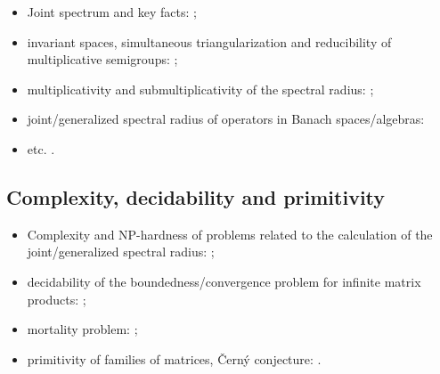\documentclass[a4paper,fleqn]{article}
\let\cite=\citep
\begin{document}
\begin{itemize}
  \item Joint spectrum and key facts: \cite{Bell:LAA05, BerWang:LAA92,
      BreSert:LMS21, EE:PAMS04, GurRod:SIAMJMAA97, Lur:LAA06:2, RS:PAMS95,
      Sert:Thesis16, Sert:CRMASP17};
  \item invariant spaces, simultaneous triangularization and reducibility of
    multiplicative semigroups: \cite{Drnov:97, Drnovsek:SM97, Drn:IEOT01,
      GPRSTT:P10, Guinand:PAMS82, HNRRR:HJM91, LMMR:JOT98, OmRadj:LAA97,
      Prot:FPM96:e, Radj:IUMJ90, RRS:PAMS00, Szep:AMH86};
  \item multiplicativity and submultiplicativity of the spectral radius:
    \cite{LR:CJM95, OmRadj:LAA97, ProtVoy:LAA17};
  \item joint/generalized spectral radius of operators in Banach
    spaces/algebras: \cite{BD:StochDyn21, BF:AIF21, Bogdanovic:ArXiv23,
      BP:LMA23, BP:RM26, EE:PAMS04, LS:LAA02, KisShulTur:20, Morris:JFA12,
      Muller:APM97, Pep:LMA11, Peperko:LAA12, RS:PAMS95, ShulTur:ArXiv12,
      ShulTur:JFA00, ShulTur:SM02, Turovskii:JFA99, TurShul:FAP00,
      TurShul:FAP12}
  \item etc. \cite{Javaheri:JMAA13, Prot:ArXiv25, ManSim:TCS78}.
\end{itemize}

\subsection*{Complexity, decidability and primitivity}
\begin{itemize}
  \item Complexity and NP-hardness of problems related to the calculation of
    the joint/generalized spectral radius: \cite{AhmJun14, AhmJng:NAHS16,
      AltPar:CDC19, AltPar:SIAMJCO20, BGT:IEEETAC00, BJ:CANT10,
      BJP:IEEETIT06, BN:SIAMJMAA09, BT:Autom00, ChangPhD12, CB:NA13,
      CHJ:SIAMJCO15, HMS:MPCPS13, Jungers:09, PJ:CDC13, Theys:PhD05,
      TB:MCSS97:4, TB:MCSS97:1, Toker:AJIFAC97};
  \item decidability of the boundedness/convergence problem for infinite matrix
    products: \cite{AKKK:92:e, BBKPT:TCS01, BC:TCS03, BT:SCL00,
      CiconePhD11, Cicone:ArXiv15, JPB:LAA08, Koz:AiT90:6:e, Koz:AiT03:9:e,
      Koz:ArXiv13, VlasJung:SCL14};
  \item mortality problem: \cite{BBKPT:TCS01, BT:IPL97, BB:TCS02,
      Saouter:inria96};
  \item primitivity of families of matrices, \v{C}ern\'{y} conjecture:
    \cite{BJO:AJIFAC15, CosJun:LNCS18, CosJun:IJFCS20, ProtVoyn:LAA12,
      Jungers:LAA12}.
\end{itemize}
\end{document}
